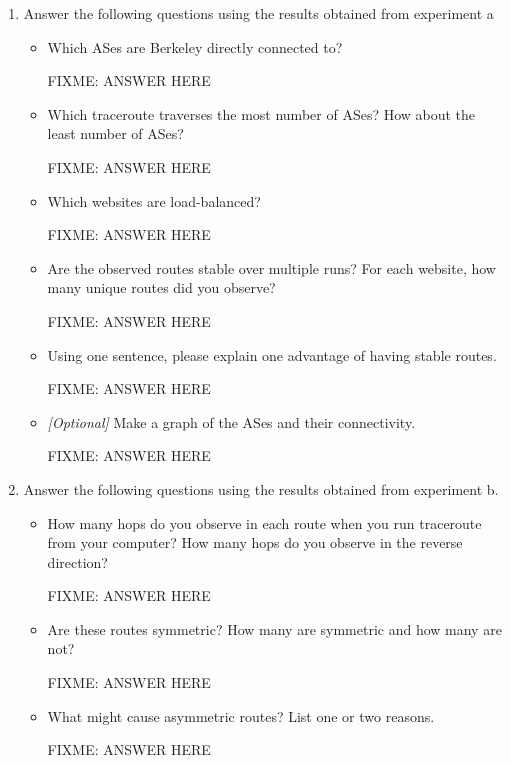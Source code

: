 \documentclass[10pt]{article}
\begin{document}
\begin{enumerate}

\item Answer the following questions using the results obtained from experiment a

\begin{itemize}

\item Which ASes are Berkeley directly connected to?

FIXME: ANSWER HERE

\item Which traceroute traverses the most number of ASes? How about the least number of ASes?

FIXME: ANSWER HERE

\item Which websites are load-balanced?

FIXME: ANSWER HERE

\item Are the observed routes stable over multiple runs? For each website, how many unique routes did you observe?

FIXME: ANSWER HERE

\item Using one sentence, please explain one advantage of having stable routes.

FIXME: ANSWER HERE

\item \emph{[Optional]} Make a graph of the ASes and their connectivity.

FIXME: ANSWER HERE

\end{itemize}

\item Answer the following questions using the results obtained from experiment b.

\begin{itemize}

\item How many hops do you observe in each route when you run traceroute from your computer? How many hops do you observe in the reverse direction?

FIXME: ANSWER HERE

\item Are these routes symmetric? How many are symmetric and how many are not?

FIXME: ANSWER HERE

\item What might cause asymmetric routes? List one or two reasons.

FIXME: ANSWER HERE

\end{itemize}
\end{enumerate}
\end{document}

